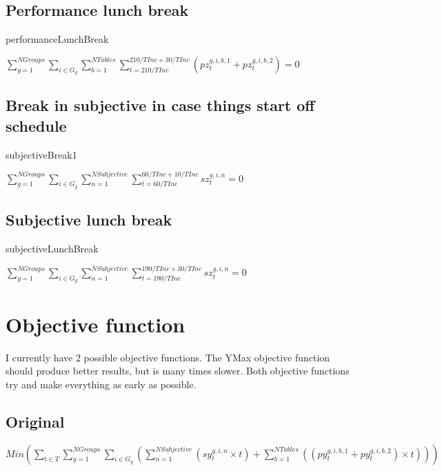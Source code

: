 \documentclass[letterpaper,11pt]{report}
\begin{document}
\FloatBarrier
\subsection{Performance lunch break}
\begin{algorithm}
\caption{performanceLunchBreak}
$
\sum\limits_{g=1}^{NGroups}
\sum\limits_{i \in G_{g}} 
  \sum\limits_{b=1}^{NTables} 
    \sum\limits_{t = 210/TInc}^{210/TInc + 30/TInc} 
      ( pz_{t}^{g,i,b,1} + pz_{t}^{g,i,b,2} ) = 0$
\end{algorithm}

\FloatBarrier
\subsection{Break in subjective in case things start off schedule}
\begin{algorithm}
\caption{subjectiveBreak1}
$
\sum\limits_{g=1}^{NGroups}
\sum\limits_{i \in G_{g}} 
  \sum\limits_{n=1}^{NSubjective} 
    \sum\limits_{t = 60/TInc}^{60/TInc + 10/TInc} 
      sz_{t}^{g,i,n} = 0$
\end{algorithm}

\FloatBarrier
\subsection{Subjective lunch break}
\begin{algorithm}
\caption{subjectiveLunchBreak}
$
\sum\limits_{g=1}^{NGroups}
\sum\limits_{i \in G_{g}} 
  \sum\limits_{n=1}^{NSubjective} 
    \sum\limits_{t = 190/TInc}^{190/TInc + 30/TInc} 
      sz_{t}^{g,i,n} = 0$
\end{algorithm}


\FloatBarrier
\section{Objective function}
I currently have 2 possible objective functions. The YMax objective
function should produce better results, but is many times slower.
Both objective functions try and make everything as early as possible.

\FloatBarrier
\subsection{Original}
$Min ( 
\sum\limits_{t \in T}
 \sum\limits_{g=1}^{NGroups}
  \sum\limits_{i \in G_{g}} (
    \sum\limits_{n=1}^{NSubjective}
      ( sy_{t}^{g,i,n} \times t )
  + \sum\limits_{b=1}^{NTables} ( ( py_{t}^{g,i,b,1} + py_{t}^{g,i,b,2} )
  \times t)
  )
) $
\end{document}
